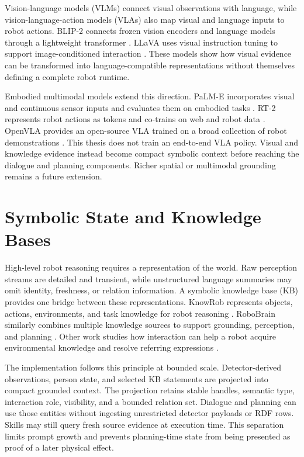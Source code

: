 Vision-language models (VLMs) connect visual observations with language, while vision-language-action models (VLAs) also map visual and language inputs to robot actions. BLIP-2 connects frozen vision encoders and language models through a lightweight transformer \parencite{li2023blip2}. LLaVA uses visual instruction tuning to support image-conditioned interaction \parencite{liu2023llava}. These models show how visual evidence can be transformed into language-compatible representations without themselves defining a complete robot runtime.

Embodied multimodal models extend this direction. PaLM-E incorporates visual and continuous sensor inputs and evaluates them on embodied tasks \parencite{driess2023palme}. RT-2 represents robot actions as tokens and co-trains on web and robot data \parencite{brohan2023rt2}. OpenVLA provides an open-source VLA trained on a broad collection of robot demonstrations \parencite{kim2024openvla}. This thesis does not train an end-to-end VLA policy. Visual and knowledge evidence instead become compact symbolic context before reaching the dialogue and planning components. Richer spatial or multimodal grounding remains a future extension.

\section{Symbolic State and Knowledge Bases}

High-level robot reasoning requires a representation of the world. Raw perception streams are detailed and transient, while unstructured language summaries may omit identity, freshness, or relation information. A symbolic knowledge base (KB) provides one bridge between these representations. KnowRob represents objects, actions, environments, and task knowledge for robot reasoning \parencite{tenorth2013knowrob,tenorth2017knowrob}. RoboBrain similarly combines multiple knowledge sources to support grounding, perception, and planning \parencite{saxena2014robobrain}. Other work studies how interaction can help a robot acquire environmental knowledge and resolve referring expressions \parencite{bastianelli2013knowledge,grassi2021knowledge}.

The implementation follows this principle at bounded scale. Detector-derived observations, person state, and selected KB statements are projected into compact grounded context. The projection retains stable handles, semantic type, interaction role, visibility, and a bounded relation set. Dialogue and planning can use those entities without ingesting unrestricted detector payloads or RDF rows. Skills may still query fresh source evidence at execution time. This separation limits prompt growth and prevents planning-time state from being presented as proof of a later physical effect.


